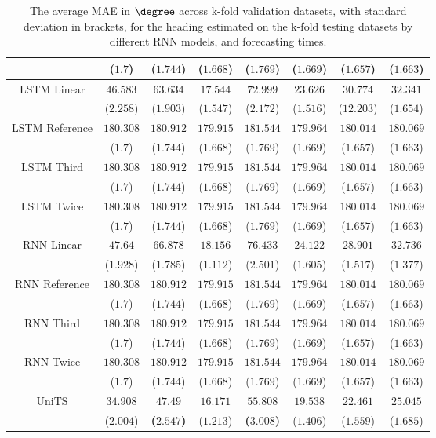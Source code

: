 \begin{table}[!ht]
{\begin{tabular}{|c|c|c|c|c|c|c|c|}
			 & ($1.7$) & ($1.744$) & ($1.668$) & ($1.769$) & ($1.669$) & ($1.657$) & ($1.663$) \\ \hline
			\multirow{2}{*}{LSTM Linear} & $46.583$ & $63.634$ & $17.544$ & $72.999$ & $23.626$ & $30.774$ & $32.341$ \\
			 & ($2.258$) & ($1.903$) & ($1.547$) & ($2.172$) & ($1.516$) & ($12.203$) & ($1.654$) \\ \hline
			\multirow{2}{*}{LSTM Reference} & $180.308$ & $180.912$ & $179.915$ & $181.544$ & $179.964$ & $180.014$ & $180.069$ \\
			 & ($1.7$) & ($1.744$) & ($1.668$) & ($1.769$) & ($1.669$) & ($1.657$) & ($1.663$) \\ \hline
			\multirow{2}{*}{LSTM Third} & $180.308$ & $180.912$ & $179.915$ & $181.544$ & $179.964$ & $180.014$ & $180.069$ \\
			 & ($1.7$) & ($1.744$) & ($1.668$) & ($1.769$) & ($1.669$) & ($1.657$) & ($1.663$) \\ \hline
			\multirow{2}{*}{LSTM Twice} & $180.308$ & $180.912$ & $179.915$ & $181.544$ & $179.964$ & $180.014$ & $180.069$ \\
			 & ($1.7$) & ($1.744$) & ($1.668$) & ($1.769$) & ($1.669$) & ($1.657$) & ($1.663$) \\ \hline
			\multirow{2}{*}{RNN Linear} & $47.64$ & $66.878$ & $18.156$ & $76.433$ & $24.122$ & $28.901$ & $32.736$ \\
			 & ($1.928$) & ($1.785$) & ($1.112$) & ($2.501$) & ($1.605$) & ($1.517$) & ($1.377$) \\ \hline
			\multirow{2}{*}{RNN Reference} & $180.308$ & $180.912$ & $179.915$ & $181.544$ & $179.964$ & $180.014$ & $180.069$ \\
			 & ($1.7$) & ($1.744$) & ($1.668$) & ($1.769$) & ($1.669$) & ($1.657$) & ($1.663$) \\ \hline
			\multirow{2}{*}{RNN Third} & $180.308$ & $180.912$ & $179.915$ & $181.544$ & $179.964$ & $180.014$ & $180.069$ \\
			 & ($1.7$) & ($1.744$) & ($1.668$) & ($1.769$) & ($1.669$) & ($1.657$) & ($1.663$) \\ \hline
			\multirow{2}{*}{RNN Twice} & $180.308$ & $180.912$ & $179.915$ & $181.544$ & $179.964$ & $180.014$ & $180.069$ \\
			 & ($1.7$) & ($1.744$) & ($1.668$) & ($1.769$) & ($1.669$) & ($1.657$) & ($1.663$) \\ \hline
			\multirow{2}{*}{UniTS} & $34.908$ & $\mathbf{47.49}$ & $16.171$ & $\mathbf{55.808}$ & $19.538$ & $22.461$ & $25.045$ \\
			 & ($2.004$) & \textbf{(}$\mathbf{2.547}$\textbf{)} & ($1.213$) & \textbf{(}$\mathbf{3.008}$\textbf{)} & ($1.406$) & ($1.559$) & ($1.685$) \\ \hline
		\end{tabular}
	}
	\caption{The average MAE in $\degree$ across k-fold validation datasets, with standard deviation in brackets, for the heading estimated on the k-fold testing datasets by different RNN models, and forecasting times.}
	\label{tab:all_direction_MAE}
\end{table}

